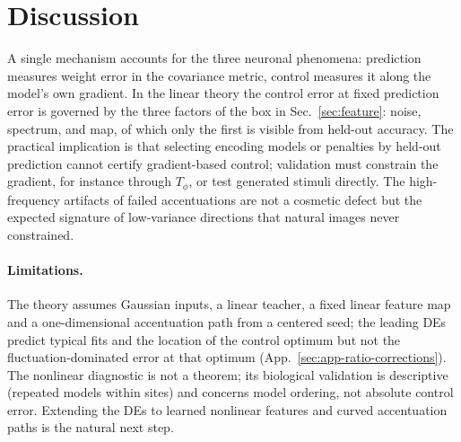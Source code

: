 \section{Discussion}
\label{sec:discussion}
A single mechanism accounts for the three neuronal phenomena: prediction measures weight error in the covariance metric, control measures it along the model's own gradient. In the linear theory the control error at fixed prediction error is governed by the three factors of the box in Sec.~\ref{sec:feature}: noise, spectrum, and map, of which only the first is visible from held-out accuracy. The practical implication is that selecting encoding models or penalties by held-out prediction cannot certify gradient-based control; validation must constrain the gradient, for instance through $T_\phi$, or test generated stimuli directly. The high-frequency artifacts of failed accentuations are not a cosmetic defect but the expected signature of low-variance directions that natural images never constrained.

\paragraph{Limitations.}
The theory assumes Gaussian inputs, a linear teacher, a fixed linear feature map and a one-dimensional accentuation path from a centered seed; the leading DEs predict typical fits and the location of the control optimum but not the fluctuation-dominated error at that optimum (App.~\ref{sec:app-ratio-corrections}). The nonlinear diagnostic is not a theorem; its biological validation is descriptive (repeated models within sites) and concerns model ordering, not absolute control error. Extending the DEs to learned nonlinear features and curved accentuation paths is the natural next step.
